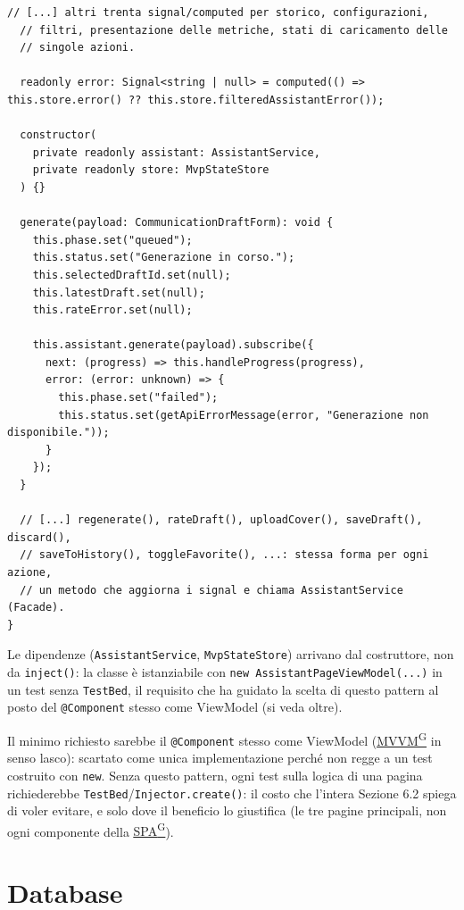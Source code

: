 \documentclass[a4paper,12pt]{article}
\providecommand{\glslink}[2]{\href{https://alittlebyte-19.github.io/Documentazione/glossario.html\#gls-#1}{\underline{#2}\textsuperscript{\scriptsize G}}}
\begin{document}
\begin{sloppypar}
\begin{lstlisting}[style=tslisting, caption={AssistantPageViewModel: classe pura costruita con new(), niente inject() né riferimenti al DOM}]
  // [...] altri trenta signal/computed per storico, configurazioni,
  // filtri, presentazione delle metriche, stati di caricamento delle
  // singole azioni.

  readonly error: Signal<string | null> = computed(() => this.store.error() ?? this.store.filteredAssistantError());

  constructor(
    private readonly assistant: AssistantService,
    private readonly store: MvpStateStore
  ) {}

  generate(payload: CommunicationDraftForm): void {
    this.phase.set("queued");
    this.status.set("Generazione in corso.");
    this.selectedDraftId.set(null);
    this.latestDraft.set(null);
    this.rateError.set(null);

    this.assistant.generate(payload).subscribe({
      next: (progress) => this.handleProgress(progress),
      error: (error: unknown) => {
        this.phase.set("failed");
        this.status.set(getApiErrorMessage(error, "Generazione non disponibile."));
      }
    });
  }

  // [...] regenerate(), rateDraft(), uploadCover(), saveDraft(), discard(),
  // saveToHistory(), toggleFavorite(), ...: stessa forma per ogni azione,
  // un metodo che aggiorna i signal e chiama AssistantService (Facade).
}
\end{lstlisting}

Le dipendenze (\texttt{AssistantService}, \texttt{MvpStateStore}) arrivano dal costruttore, non da \texttt{inject()}: la classe è istanziabile con \texttt{new AssistantPageViewModel(...)} in un test senza \texttt{TestBed}, il requisito che ha guidato la scelta di questo pattern al posto del \texttt{@Component} stesso come ViewModel (si veda oltre).

Il minimo richiesto sarebbe il \texttt{@Component} stesso come ViewModel (\glslink{mvvm-model-view-viewmodel}{MVVM} in senso lasco): scartato come unica implementazione perché non regge a un test costruito con \texttt{new}. Senza questo pattern, ogni test sulla logica di una pagina richiederebbe \texttt{TestBed}/\texttt{Injector.create()}: il costo che l'intera Sezione 6.2 spiega di voler evitare, e solo dove il beneficio lo giustifica (le tre pagine principali, non ogni componente della \glslink{spa-single-page-application}{SPA}).

\end{sloppypar}

\section{Database}
\end{document}
